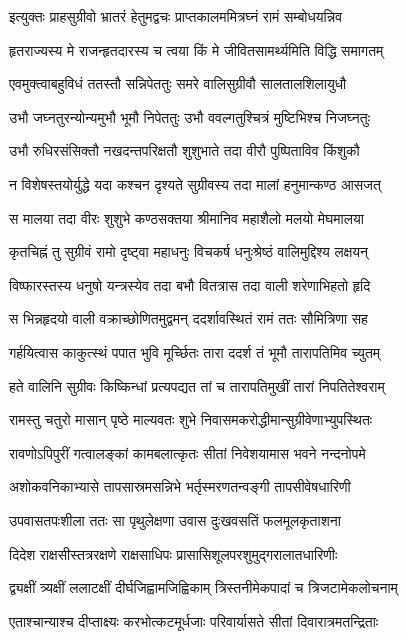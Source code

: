 \twolineshloka
{इत्युक्तः प्राहसुग्रीवो भ्रातरं हेतुमद्वचः}
{प्राप्तकालममित्रघ्नं रामं सम्बोधयन्निव}


\twolineshloka
{हृतराज्यस्य मे राजन्हृतदारस्य च त्वया}
{किं मे जीवितसामर्थ्यमिति विद्धि समागतम्}


\twolineshloka
{एवमुक्त्वाबहुविधं ततस्तौ सन्निपेततुः}
{समरे वालिसुग्रीवौ सालतालशिलायुधौ}


\twolineshloka
{उभौ जघ्नतुरन्योन्यमुभौ भूमौ निपेततुः}
{उभौ ववल्गतुश्चित्रं मुष्टिभिश्च निजघ्नतुः}


\twolineshloka
{उभौ रुधिरसंसिक्तौ नखदन्तपरिक्षतौ}
{शुशुभाते तदा वीरौ पुष्पिताविव किंशुकौ}


\twolineshloka
{न विशेषस्तयोर्युद्धे यदा कश्चन दृश्यते}
{सुग्रीवस्य तदा मालां हनुमान्कण्ठ आसजत्}


\twolineshloka
{स मालया तदा वीरः शुशुभे कण्ठसक्तया}
{श्रीमानिव महाशैलो मलयो मेघमालया}


\twolineshloka
{कृतचिह्नं तु सुग्रीवं रामो दृष्ट्वा महाधनुः}
{विचकर्ष धनुःश्रेष्ठं वालिमुद्दिश्य लक्षयन्}


\twolineshloka
{विष्फारस्तस्य धनुषो यन्त्रस्येव तदा बभौ}
{वितत्रास तदा वाली शरेणाभिहतो हृदि}


\twolineshloka
{स भिन्नहृदयो वाली वक्राच्छोणितमुद्वमन्}
{ददर्शावस्थितं रामं ततः सौमित्रिणा सह}


\twolineshloka
{गर्हयित्वास काकुत्स्थं पपात भुवि मूर्च्छितः}
{तारा ददर्श तं भूमौ तारापतिमिव च्युतम्}


\twolineshloka
{हते वालिनि सुग्रीवः किष्किन्धां प्रत्यपद्यत}
{तां च तारापतिमुखीं तारां निपतितेश्वराम्}


\twolineshloka
{रामस्तु चतुरो मासान् पृष्ठे माल्यवतः शुभे}
{निवासमकरोद्धीमान्सुग्रीवेणाभ्युपस्थितः}


\twolineshloka
{रावणोऽपिपुरीं गत्वालङ्कां कामबलात्कृतः}
{सीतां निवेशयामास भवने नन्दनोपमे}


\twolineshloka
{अशोकवनिकाभ्यासे तापसास्रमसन्निभे}
{भर्तृस्मरणतन्वङ्गी तापसीवेषधारिणी}


\twolineshloka
{उपवासतपःशीला ततः सा पृथुलेक्षणा}
{उवास दुःखवसतिं फलमूलकृताशना}


\twolineshloka
{दिदेश राक्षसीस्तत्ररक्षणे राक्षसाधिपः}
{प्रासासिशूलपरशुमुद्गरालातधारिणीः}


\twolineshloka
{द्व्यक्षीं त्र्यक्षीं ललाटक्षीं दीर्घजिह्वामजिह्विकाम्}
{त्रिस्तनीमेकपादां च त्रिजटामेकलोचनाम्}


\twolineshloka
{एताश्चान्याश्च दीप्ताक्ष्यः करभोत्कटमूर्धजाः}
{परिवार्यासते सीतां दिवारात्रमतन्द्रिताः}


